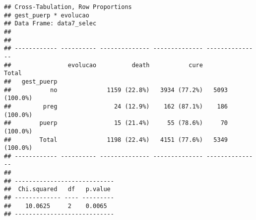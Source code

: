\documentclass[
]{article}
\newenvironment{Shaded}{\begin{snugshade}}{\end{snugshade}}
\newcommand{\DataTypeTok}[1]{\textcolor[rgb]{0.13,0.29,0.53}{#1}}
\newcommand{\KeywordTok}[1]{\textcolor[rgb]{0.13,0.29,0.53}{\textbf{#1}}}
\newcommand{\NormalTok}[1]{#1}
\newcommand{\OperatorTok}[1]{\textcolor[rgb]{0.81,0.36,0.00}{\textbf{#1}}}
\newcommand{\OtherTok}[1]{\textcolor[rgb]{0.56,0.35,0.01}{#1}}
\newcommand{\StringTok}[1]{\textcolor[rgb]{0.31,0.60,0.02}{#1}}
\begin{document}
\begin{Shaded}
\end{Shaded}

\begin{Shaded}
\end{Shaded}

\begin{verbatim}
## Cross-Tabulation, Row Proportions  
## gest_puerp * evolucao  
## Data Frame: data7_selec  
## 
## 
## ------------ ---------- -------------- -------------- ---------------
##                evolucao          death           cure           Total
##   gest_puerp                                                         
##           no              1159 (22.8%)   3934 (77.2%)   5093 (100.0%)
##         preg                24 (12.9%)    162 (87.1%)    186 (100.0%)
##        puerp                15 (21.4%)     55 (78.6%)     70 (100.0%)
##        Total              1198 (22.4%)   4151 (77.6%)   5349 (100.0%)
## ------------ ---------- -------------- -------------- ---------------
## 
## ----------------------------
##  Chi.squared   df   p.value 
## ------------- ---- ---------
##    10.0625     2    0.0065  
## ----------------------------
\end{verbatim}

\begin{Shaded}
\end{Shaded}
\end{document}
